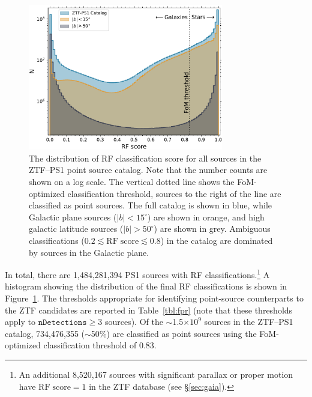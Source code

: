 \documentclass[twocolumn, dvipdfmx]{aastex62}
\begin{document}
\begin{CJK*}{UTF8}{gbsn}
\begin{figure}[htb]
 \centering
  \includegraphics[width=3.35in]{./Figures/ZTF_PS1_cat_hist.pdf}
  \caption{ The distribution of RF classification score for all sources in
  the ZTF--PS1 point source catalog. Note that the number counts are shown on
  a log scale. The vertical dotted line shows the FoM-optimized
  classification threshold, sources to the right of the line are classified
  as point sources. The full catalog is shown in blue, while Galactic plane
  sources ($|b| < 15^{\circ}$) are shown in orange, and high galactic
  latitude sources ($|b| > 50^{\circ}$) are shown in grey. Ambiguous
  classifications ($0.2 \lesssim \mathrm{RF\;score} \lesssim 0.8$) in the
  catalog are dominated by sources in the Galactic plane.}
  \label{fig:ztf_hist}
\end{figure}

In total, there are 1,484,281,394 PS1 sources with RF
classifications.\footnote{An additional 8,520,167 sources with
significant parallax or proper motion have $\mathrm{RF\;score} = 1$ in the
ZTF database (see \S\ref{sec:gaia}).} A histogram showing the distribution
of the final RF classifications is shown in Figure~\ref{fig:ztf_hist}. The
thresholds appropriate for identifying point-source counterparts to the ZTF
candidates are reported in Table~\ref{tbl:fpr} (note that these thresholds
apply to $\mathtt{nDetections} \ge 3$ sources). Of the $\sim$1.5$\times
10^{9}$ sources in the ZTF--PS1 catalog, 734,476,355 ($\sim$50\%) are
classified as point sources using the FoM-optimized classification threshold of 0.83.


\end{CJK*}
\end{document}
